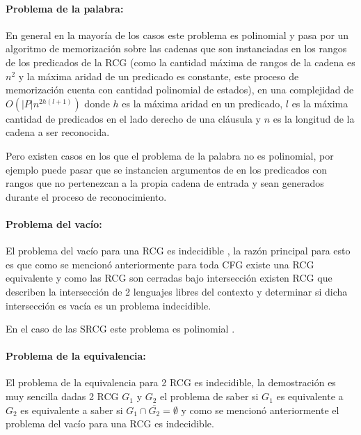 \paragraph{Problema de la palabra:} En general en la mayoría de los casos este problema es polinomial y pasa por
un algoritmo de memorización sobre las cadenas que son instanciadas en los rangos de los predicados de la RCG \cite{mainRCGBib} (como la cantidad
máxima de rangos de la cadena es $n^2$ y la máxima aridad de un predicado es constante, este proceso de memorización cuenta
con cantidad polinomial de estados), en
una complejidad de $O(|P|n^{2h(l+1)})$ donde $h$ es la máxima aridad en un predicado, $l$ es la máxima cantidad de predicados
en el lado derecho de una cláusula y $n$ es la longitud de la cadena a ser reconocida.

Pero existen casos en los que el problema de la palabra no
es polinomial, por ejemplo puede pasar que se instancien argumentos de en los predicados con rangos que no pertenezcan
a la propia cadena de entrada y sean generados durante el proceso de reconocimiento.

\paragraph{Problema del vacío:} El problema del vacío para una RCG es indecidible \cite{propertiesRCGBib}, la razón principal para esto es que como se mencionó anteriormente
para toda CFG existe una RCG equivalente y como las RCG son cerradas bajo intersección existen RCG que describen
la intersección de 2 lenguajes libres del contexto y determinar si dicha intersección es vacía es un problema indecidible.

En el caso de las SRCG este problema es polinomial \cite{mainRCGBib}.

\paragraph{Problema de la equivalencia:} El problema de la equivalencia para 2 RCG es indecidible, la demostración es muy sencilla dadas 2 RCG $G_1$ y $G_2$ el problema
de saber si $G_1$ es equivalente a $G_2$ es equivalente a saber si $G_1\cap \overline{G_2}=\emptyset$ y como se mencionó anteriormente el problema del vacío para una RCG
es indecidible.
